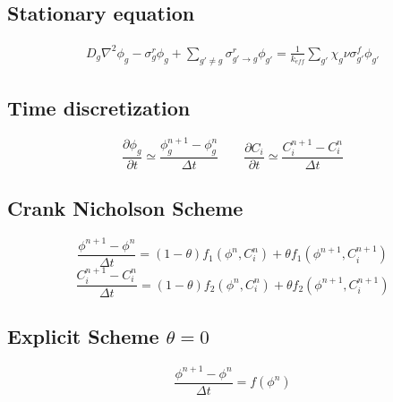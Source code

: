\subsection{Stationary equation}
\begin{equation}
\begin{split}         
D_{g} \nabla^{2}                                                      \phi_{g} 
-\sigma_{g}^{r}                                                       \phi_{g} 
+ \sum_{g\prime\neq g} \sigma_{g'\rightarrow g }^{r}                  \phi_{g\prime}  =
\frac{1}{k_{eff}}\sum_{g\prime} \chi_{g}\nu\sigma_{g'}^{f}                  \phi_{g\prime}    
\end{split} 
\end{equation}


\subsection{Time discretization}

\begin{equation}
 \frac{\partial \phi_{g}}{\partial t}   \simeq \frac{\phi_{g}^{n+1}-\phi_{g}^{n}}{\Delta t}  \quad \quad
 \frac{\partial C_{i}}{\partial t}   \simeq \frac{C_{i}^{n+1}-C_{i}^{n}}{\Delta t}  
\end{equation}

\subsection{Crank Nicholson Scheme}
\begin{equation}
\frac{\phi^{n+1}-\phi^{n}}{\Delta t} = (1-\theta) f_{1}(\phi^{n},C_{i}^{n}) + \theta f_{1}(\phi^{n+1},C_{i}^{n+1})  
\end{equation}
\begin{equation}
\frac{C_{i}^{n+1}-C_{i}^{n}}{\Delta t} = (1-\theta) f_{2}(\phi^{n},C_{i}^{n}) + \theta f_{2}(\phi^{n+1},C_{i}^{n+1})  
\end{equation}

\subsection{Explicit Scheme $\theta=0$}
\begin{equation}
\frac{\phi^{n+1}-\phi^{n}}{\Delta t} = f(\phi^{n})   
\end{equation}


